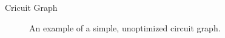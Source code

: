 \begin{frame}{Cricuit Graph}
\begin{minipage}{.60\textwidth}
\begin{figure}[htp]
            \caption{An example of a simple, unoptimized circuit graph.}
        \end{figure}
    \end{minipage}
\end{frame}

%             


